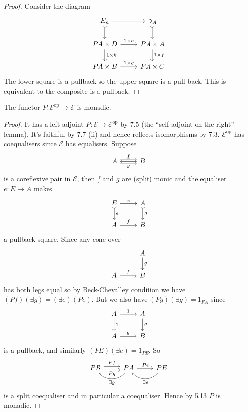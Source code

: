 \documentclass[a4paper]{article}
\begin{document}
\begin{proof}
  Consider the diagram
  \[
    \begin{tikzcd}
      E_n \ar[r] \ar[d, tail] & \ni_A \ar[d, tail] \\
      PA \times D \ar[r, "1 \times h"] \ar[d, "1 \times k"] & PA \times A \ar[d, "1 \times f"] \\
      PA \times B \ar[r, "1 \times g"] & PA \times C
    \end{tikzcd}
  \]
  The lower square is a pullback so the upper square is a pull back. This is equivalent to the composite is a pullback.
\end{proof}

\begin{theorem}[Paré]
  The functor \(P: \mathcal E^{\text{op}} \to \mathcal E\) is monadic.
\end{theorem}

\begin{proof}
  It has a left adjoint \(P: \mathcal E \to \mathcal E^{\text{op}}\) by 7.5 (the ``self-adjoint on the right'' lemma). It's faithful by 7.7 (ii) and hence reflects isomorphisms by 7.3. \(\mathcal E^{\text{op}}\) has coequalisers since \(\mathcal E\) has equalisers. Suppose
  \[
    \begin{tikzcd}
      A \ar[r, shift left, "f"] \ar[r, shift right, "g"'] & B \ar[l, "r"']
    \end{tikzcd}
  \]
  is a coreflexive pair in \(\mathcal E\), then \(f\) and \(g\) are (split) monic and the equaliser \(e: E \to A\) makes
  \[
    \begin{tikzcd}
      E \ar[r, "e"] \ar[d, "e", tail] & A \ar[d, "g", tail] \\
      A \ar[r, "f"] & B
    \end{tikzcd}
  \]
  a pullback square. Since any cone over
  \[
    \begin{tikzcd}
      & A \ar[d, "g"] \\
      A \ar[r, "f"] & B
    \end{tikzcd}
  \]
  has both legs equal so by Beck-Chevalley condition we have \((Pf)(\exists g) = (\exists e)(Pe)\). But we also have \((Pg) (\exists g) = 1_{FA}\) since
  \[
    \begin{tikzcd}
      A \ar[r, "1"] \ar[d, "1"] & A \ar[d, "g"] \\
      A \ar[r, "g"] & B
    \end{tikzcd}
  \]
  is a pullback, and similarly \((PE)(\exists e) = 1_{PE}\). So
  \[
    \begin{tikzcd}
      PB \ar[r, shift left, "Pf"] \ar[r, shift right, "Pg"'] & PA \ar[l, bend left=50, "\exists g"] \ar[r, "Pe"] & PE \ar[l, bend left=50, "\exists e"]
    \end{tikzcd}
  \]
  is a split coequaliser and in particular a coequaliser. Hence by 5.13 \(P\) is monadic.
\end{proof}
\end{document}
